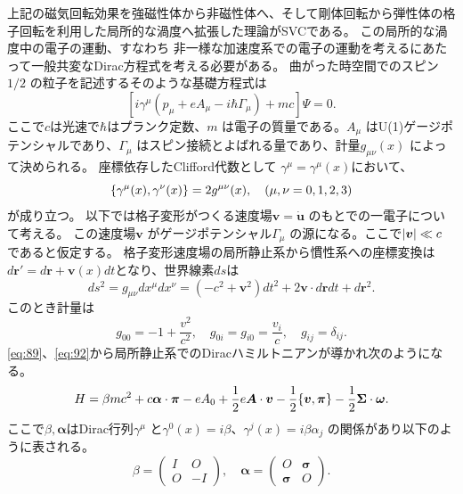 \documentclass[dvipdfmx,11pt]{jsreport}
\numberwithin{equation}{chapter}
\numberwithin{table}{chapter}
\begin{document}
上記の磁気回転効果を強磁性体から非磁性体へ、そして剛体回転から弾性体の格子回転を利用した局所的な渦度へ拡張した理論がSVCである。
この局所的な渦度中の電子の運動、すなわち
非一様な加速度系での電子の運動を考えるにあたって一般共変なDirac方程式を考える必要がある。
曲がった時空間でのスピン$1 /2$ の粒子を記述するそのような基礎方程式は
\begin{equation}
\label{eq:89}
	\left[ i \gamma^{\mu}(p_{\mu}+eA_{\mu}-i\hbar \Gamma_{\mu})+mc \right] \Psi =0
.\end{equation}
ここで$c$は光速で$\hbar$はプランク定数、$m$ は電子の質量である。$A_{\mu}$ はU(1)ゲージポテンシャルであり、$\Gamma_{\mu}$ はスピン接続とよばれる量であり、計量$g_{\mu\nu}(x)$ によって決められる。
座標依存したClifford代数として
$\gamma^{\mu}=\gamma^{\mu}(x)$において、
\begin{equation}
\label{eq:90}
\acomm{\gamma^{\mu}(x)}{\gamma^{\nu}(x)}=2g^{\mu\nu}(x),\quad(\mu,\nu=0,1,2,3)
\end{equation}
が成り立つ。
以下では格子変形がつくる速度場$\bm{v}=\dot{\bm{u}}$ のもとでの一電子について考える。
この速度場$\bm{v}$ がゲージポテンシャル$\Gamma_{\mu}$ の源になる。ここで$\abs{\bm{v}}\ll c$ であると仮定する。
格子変形速度場の局所静止系から慣性系への座標変換は$d\bm{r}'=d\bm{r}+\bm{v}(x)dt$となり、世界線素$ds$は
\begin{equation}
\label{eq:91}
	ds^2=g_{\mu\nu}dx^{\mu}dx^{\nu}=(-c^2+\bm{v}^2)dt^2+2\bm{v}\cdot d\bm{r} dt + d\bm{r}^2
.\end{equation}
このとき計量は
\begin{equation}
\label{eq:92}
	g_{00}=-1+\frac{v^2}{c^2},\quad g_{0i}=g_{i0}=\frac{v_i}{c},\quad g_{ij}=\delta_{ij}
.\end{equation}
\eqref{eq:89}、\eqref{eq:92}から局所静止系でのDiracハミルトニアンが導かれ次のようになる。\cite{physrevb.96.020401}
\begin{equation}
\label{eq:93}
	H=\beta m c^2+c \bm{\alpha}\cdot \bm{\pi }-eA_0+\frac{1}{2}e \bm{A}\cdot \bm{v}-\frac{1}{2}\acomm{\bm{v}}{\bm{\pi }}-\frac{1}{2}\bm{\Sigma}\cdot  \bm{\omega}
.\end{equation}
ここで$\beta,\bm{\alpha}$はDirac行列$\gamma^{\mu}$ と$\gamma^{0}(x)=i\beta$、$\gamma^{j}(x)=i\beta\alpha_{j}$ の関係があり以下のように表される。
\begin{equation}
\label{eq:94}
\beta = \begin{pmatrix}I &O\\O&-I  \end{pmatrix},\quad \bm{\alpha}=\begin{pmatrix} O&\bm{\sigma} \\ \bm{\sigma}&O\end{pmatrix} 
.\end{equation}
\end{document}
